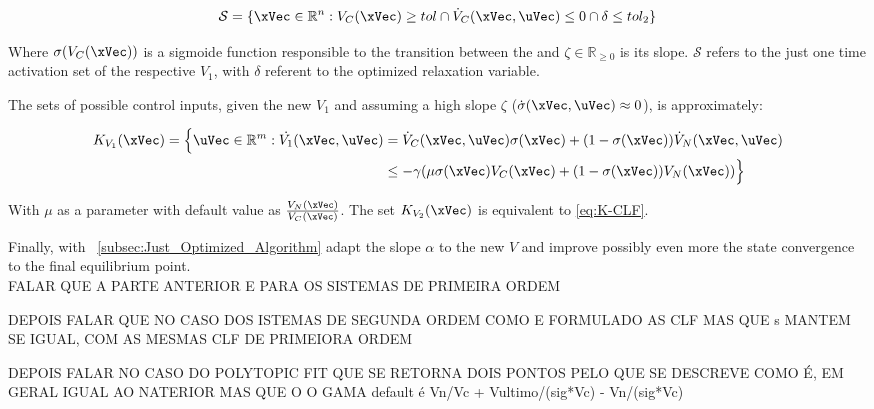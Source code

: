 \begin{equation}
    \mathcal{S} = \{\xVec \in \mathbb{R}^n: V_{C}(\xVec) \geq tol \cap \dot{V}_{C}(\xVec, \uVec) \leq 0 \cap \delta \leq tol_2 \}
    \label{eq:New_2-CLF-S_actuationPhaseSet}
\end{equation}

Where \(\sigma(V_C(\xVec))\) is a sigmoide function responsible to the transition between the  and \(\zeta \in \mathbb{R}_{\geq 0}\) is its slope. \(\mathcal{S}\) refers to the just one time activation set of the respective  \(V_1\), with \(\delta\) referent to the   optimized relaxation variable. 



The sets of possible control inputs, given the new  \(V_1\) and assuming a high slope \(\zeta\) (\(\dot{\sigma}(\xVec, \uVec)\approx 0\)), is approximately:

\begin{align}
    K_{V_1}(\xVec) = \Bigl\{\uVec \in \mathbb{R}^m: \dot{V_1}(\xVec, \uVec) &= \dot{V}_{C}(\xVec, \uVec) \sigma(\xVec) + (1-\sigma(\xVec))\dot{V}_{N}(\xVec, \uVec) \notag \\
    &\leq -\gamma( \mu \sigma(\xVec) V_{C}(\xVec) + (1 - \sigma(\xVec))V_{N}(\xVec)  )\Bigr\}
    \label{eq:2-CLF-S_Constraint}
\end{align}

With \(\mu\) as a parameter with default value as \( \frac{V_{N}(\xVec)}{V_{C}(\xVec)} \). The set \(K_{V_2}(\xVec)\) is equivalent to \ref{eq:K-CLF}. \par

Finally, with ~\ref{subsec:Just_Optimized_Algorithm} adapt the  slope \(\alpha\) to the new  \(V\) and improve possibly even more the state convergence to the final equilibrium point.\\


FALAR QUE A PARTE ANTERIOR E PARA OS SISTEMAS DE PRIMEIRA ORDEM 

DEPOIS FALAR QUE NO CASO DOS ISTEMAS DE SEGUNDA ORDEM COMO E FORMULADO AS CLF MAS QUE s MANTEM SE IGUAL, COM AS MESMAS CLF DE PRIMEIORA ORDEM

DEPOIS FALAR NO CASO DO POLYTOPIC FIT QUE SE RETORNA DOIS PONTOS PELO QUE SE DESCREVE COMO É, EM GERAL IGUAL AO NATERIOR MAS QUE O O GAMA default é Vn/Vc + Vultimo/(sig*Vc) - Vn/(sig*Vc)



